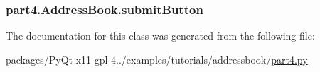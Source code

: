 \subsubsection[{submit\+Button}]{\setlength{\rightskip}{0pt plus 5cm}part4.\+Address\+Book.\+submit\+Button}\label{classpart4_1_1AddressBook_a8f3dabaca0a5417170b48e183fd09cbd}


The documentation for this class was generated from the following file\+:\begin{DoxyCompactItemize}
\item 
packages/\+Py\+Qt-\/x11-\/gpl-\/4../examples/tutorials/addressbook/\hyperlink{part4_8py}{part4.\+py}\end{DoxyCompactItemize}
